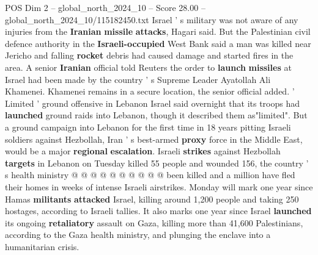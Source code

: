 \begin{textsample}{POS Dim 2 – global\_north\_2024\_10 – Score 28.00 – global\_north\_2024\_10/115182450.txt}
Israel ' s military was not aware of any injuries from the \textbf{Iranian} \textbf{missile} \textbf{attacks}, Hagari said.
But the Palestinian civil defence authority in the \textbf{Israeli-occupied} West Bank said a man was killed near Jericho and falling \textbf{rocket} debris had caused damage and started fires in the area.
A senior \textbf{Iranian} official told Reuters the order to \textbf{launch} \textbf{missiles} at Israel had been made by the country ' s Supreme Leader Ayatollah Ali Khamenei.
Khamenei remains in a secure location, the senior official added. ' Limited ' ground offensive in Lebanon Israel said overnight that its troops had \textbf{launched} ground raids into Lebanon, though it described them as"limited".
But a ground campaign into Lebanon for the first time in 18 years pitting Israeli soldiers against Hezbollah, Iran ' s best-armed \textbf{proxy} force in the Middle East, would be a major \textbf{regional} \textbf{escalation}.
Israeli \textbf{strikes} against Hezbollah \textbf{targets} in Lebanon on Tuesday killed 55 people and wounded 156, the country ' s health ministry @ @ @ @ @ @ @ @ @ @ been killed and a million have fled their homes in weeks of intense Israeli airstrikes.
Monday will mark one year since Hamas \textbf{militants} \textbf{attacked} Israel, killing around 1,200 people and taking 250 hostages, according to Israeli tallies.
It also marks one year since Israel \textbf{launched} its ongoing \textbf{retaliatory} assault on Gaza, killing more than 41,600 Palestinians, according to the Gaza health ministry, and plunging the enclave into a humanitarian crisis.

\end{textsample}
